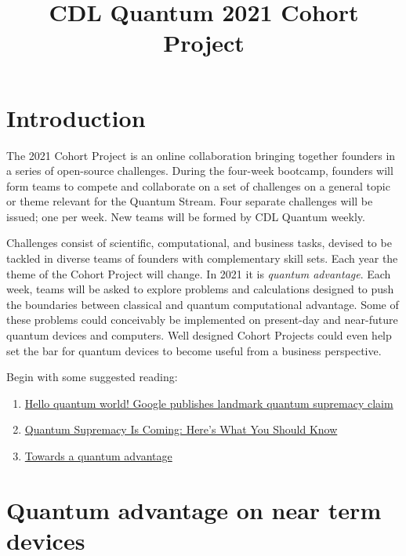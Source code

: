 \documentclass[12pt]{article}
\title{CDL Quantum 2021 Cohort Project}
\begin{document}
\maketitle

\thispagestyle{empty}
\section{Introduction}

The 2021 Cohort Project is an online collaboration bringing together founders in a series of open-source challenges.
During the four-week bootcamp, founders will form teams to compete and collaborate on a set of challenges on a general topic or theme
relevant for the Quantum Stream.  Four separate challenges will be issued; one per week.  New teams will be formed by CDL Quantum weekly.

Challenges consist of scientific, computational, and business tasks, devised to be tackled in diverse teams of founders with complementary skill sets.  Each year the theme of the Cohort Project will change.  In 2021 it is {\it quantum advantage}.  
Each week, teams will be asked to explore problems and calculations designed to push the boundaries between classical
and quantum computational advantage.
Some of these problems could conceivably be implemented on present-day and near-future quantum devices and computers.
Well designed Cohort Projects could even help set the bar for quantum devices to become useful from a business perspective.

Begin with some suggested reading:
\begin{enumerate}
\item \href{https://www.nature.com/articles/d41586-019-03213-z}{Hello quantum world! Google publishes landmark quantum supremacy claim}
\item \href{https://physicsworld.com/a/towards-a-quantum-advantage/}{Quantum Supremacy Is Coming: Here's What You Should Know}
\item \href{https://physicsworld.com/a/towards-a-quantum-advantage/}{Towards a quantum advantage}
\end{enumerate}


\section{Quantum advantage on near term devices}
\end{document}
